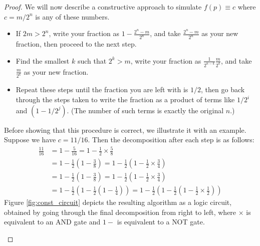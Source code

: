 \documentclass{article}
\theoremstyle{definition}
\begin{document}
\begin{proof}
We will now describe a constructive approach to simulate $f(p)\equiv c$ where $c = m/2^n$ is any of these numbers.
\begin{itemize}
\item If $2m > 2^n$, write your fraction as $1 - \frac{2^n - m}{2^n}$, and take $\frac{2^n - m}{2^n}$ as your new fraction, then proceed to the next step.
\item Find the smallest $k$ such that $2^k > m$, write your fraction as $\frac{1}{2^{n-k}}\frac{m}{2^k}$, and take $\frac{m}{2^k}$ as your new fraction.
\item Repeat these steps until the fraction you are left with is $1/2$, then go back through the steps taken to write the fraction as a product of terms like $1/2^i$ and $(1-1/2^j)$. (The number of such terms is exactly the original $n$.)
\end{itemize}
Before showing that this procedure is correct, we illustrate it with an example.
Suppose we have $c = 11/16$.
Then the decomposition after each step is as follows:
\begin{align*}
\frac{11}{16} &= 1- \frac{5}{16} 
= 1 - \frac{1}{2} \times \frac{5}{8} \\
&= 1 - \frac{1}{2} \left(1 - \frac{3}{8}\right) 
= 1 - \frac{1}{2} \left(1 - \frac{1}{2} \times \frac{3}{4}\right) \\
&= 1 - \frac{1}{2} \left(1 - \frac{3}{8}\right) 
= 1 - \frac{1}{2} \left(1 - \frac{1}{2} \times \frac{3}{4}\right) \\
&= 1 - \frac{1}{2} \left(1 - \frac{1}{2}\left(1-\frac{1}{4}\right)\right)
= 1 - \frac{1}{2} \left(1 - \frac{1}{2}\left(1-\frac{1}{2} \times \frac{1}{2}\right)\right)
\end{align*}
Figure \ref{fig:const_circuit} depicts the resulting algorithm as a logic circuit, obtained by going through the final decomposition from right to left, where $\times$ is equivalent to an {\footnotesize AND} gate and $1-$ is equivalent to a {\footnotesize NOT} gate.

\begin{figure}
\centering
{}
\end{figure}
\end{proof}
\end{document}
